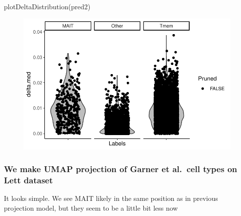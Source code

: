 \documentclass[
  letterpaper,
  DIV=11,
  numbers=noendperiod]{scrartcl}
\newenvironment{Shaded}{\begin{snugshade}}{\end{snugshade}}
\newcommand{\AttributeTok}[1]{\textcolor[rgb]{0.40,0.45,0.13}{#1}}
\newcommand{\FloatTok}[1]{\textcolor[rgb]{0.68,0.00,0.00}{#1}}
\newcommand{\FunctionTok}[1]{\textcolor[rgb]{0.28,0.35,0.67}{#1}}
\newcommand{\NormalTok}[1]{\textcolor[rgb]{0.00,0.23,0.31}{#1}}
\newcommand{\OtherTok}[1]{\textcolor[rgb]{0.00,0.23,0.31}{#1}}
\newcommand{\SpecialCharTok}[1]{\textcolor[rgb]{0.37,0.37,0.37}{#1}}
\newcommand{\StringTok}[1]{\textcolor[rgb]{0.13,0.47,0.30}{#1}}
\begin{document}
\begin{Shaded}
\begin{Highlighting}[]
\FunctionTok{plotDeltaDistribution}\NormalTok{(pred2)}
\end{Highlighting}
\end{Shaded}

\begin{figure}[H]

{\centering \includegraphics{2-Lett-data-SingleR_pdf_files/figure-pdf/unnamed-chunk-18-1.pdf}

}

\end{figure}

\hypertarget{we-make-umap-projection-of-garner-et-al.-cell-types-on-lett-dataset}{%
\subsubsection{We make UMAP projection of Garner et al.~cell types on
Lett
dataset}\label{we-make-umap-projection-of-garner-et-al.-cell-types-on-lett-dataset}}

It looks simple. We see MAIT likely in the same position as in previous
projection model, but they seem to be a little bit less now

\begin{Shaded}
\end{Shaded}
\end{document}
